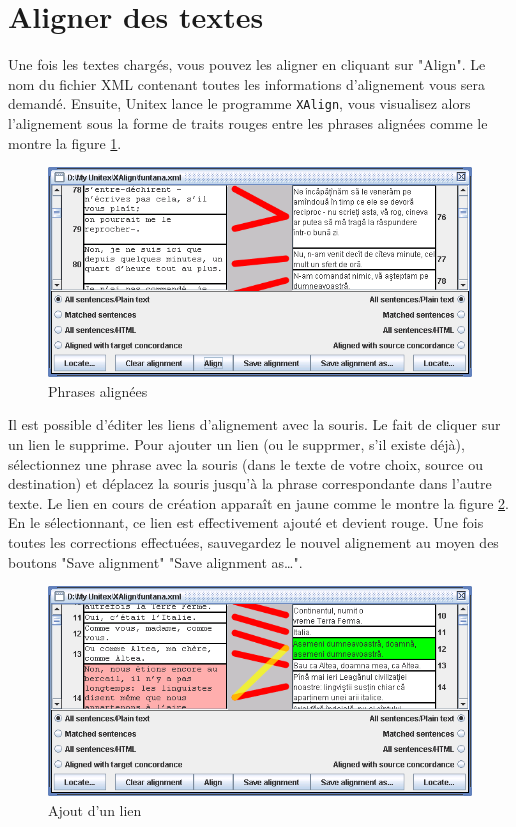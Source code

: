 \section{Aligner des textes}
Une fois les textes chargés, vous pouvez les aligner en cliquant sur "Align". Le nom du fichier XML
contenant toutes les informations d'alignement vous sera demandé. Ensuite, Unitex lance le programme
\verb+XAlign+, vous visualisez alors l'alignement sous la forme de traits rouges entre les phrases
alignées comme le montre la figure \ref{fig-x-links}.

\begin{figure}[!ht]
\begin{center}
\includegraphics[width=15.5cm]{resources/img/figX-4.png}
\caption{Phrases alignées\label{fig-x-links}}
\end{center}
\end{figure}

\bigskip
\noindent Il est possible d'éditer les liens d'alignement avec la souris. Le fait de cliquer sur un
lien le supprime. Pour ajouter un lien (ou le supprmer, s'il existe déjà), sélectionnez une phrase
avec la souris (dans le texte de votre choix, source ou destination) et déplacez la souris jusqu'à
la phrase correspondante dans l'autre texte. Le lien en cours de création apparaît en jaune comme
le montre la figure \ref{fig-x-adding-a-link}. En le sélectionnant, ce lien est effectivement
ajouté et devient rouge. Une fois toutes les corrections effectuées, sauvegardez le nouvel  
alignement au moyen des boutons "Save alignment" "Save alignment as\ldots".

\begin{figure}[!ht]
\begin{center}
\includegraphics[width=15.5cm]{resources/img/figX-5.png}
\caption{Ajout d'un lien\label{fig-x-adding-a-link}}
\end{center}
\end{figure}

